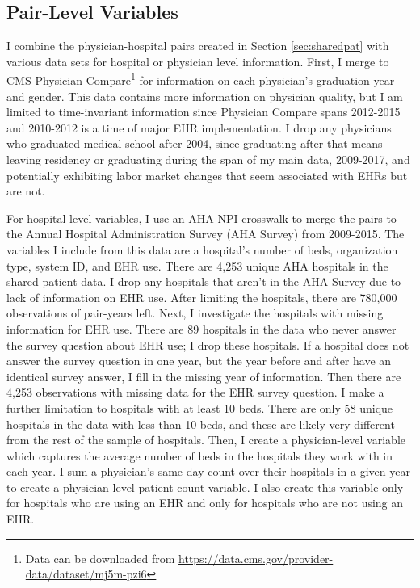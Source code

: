 \documentclass[11pt]{article}
\begin{document}
\subsection{Pair-Level Variables}

I combine the physician-hospital pairs created in Section \ref{sec:sharedpat} with various data sets for hospital or physician level information. First, I merge to CMS Physician Compare\footnote{Data can be downloaded from \hyperlink{https://data.cms.gov/provider-data/dataset/mj5m-pzi6}{https://data.cms.gov/provider-data/dataset/mj5m-pzi6}} for information on each physician's graduation year and gender. This data contains more information on physician quality, but I am limited to time-invariant information since Physician Compare spans 2012-2015 and 2010-2012 is a time of major EHR implementation. I drop any physicians who graduated medical school after 2004, since graduating after that means leaving residency or graduating during the span of my main data, 2009-2017, and potentially exhibiting labor market changes that seem associated with EHRs but are not. 

For hospital level variables, I use an AHA-NPI crosswalk to merge the pairs to the Annual Hospital Administration Survey (AHA Survey) from 2009-2015. The variables I include from this data are a hospital's number of beds, organization type, system ID, and EHR use. There are 4,253 unique AHA hospitals in the shared patient data. I drop any hospitals that aren't in the AHA Survey due to lack of information on EHR use. After limiting the hospitals, there are 780,000 observations of pair-years left. Next, I investigate the hospitals with missing information for EHR use. There are 89 hospitals in the data who never answer the survey question about EHR use; I drop these hospitals. If a hospital does not answer the survey question in one year, but the year before and after have an identical survey answer, I fill in the missing year of information. Then there are 4,253 observations with missing data for the EHR survey question. I make a further limitation to hospitals with at least 10 beds. There are only 58 unique hospitals in the data with less than 10 beds, and these are likely very different from the rest of the sample of hospitals. Then, I create a physician-level variable which captures the average number of beds in the hospitals they work with in each year. I sum a physician's same day count over their hospitals in a given year to create a physician level patient count variable. I also create this variable only for hospitals who are using an EHR and only for hospitals who are not using an EHR.
\end{document}
